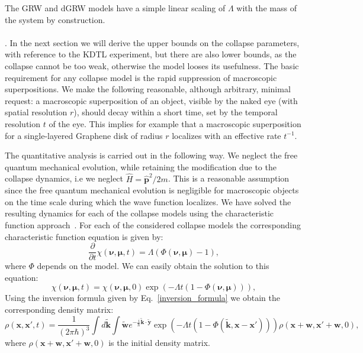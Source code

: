 \documentclass[12pt,groupedaddress,pra,aps]{revtex4-1}
\begin{document}
The GRW and dGRW models have a simple linear scaling of $\Lambda$ with the mass of the system by construction. \\ \\

.
In the next section we will derive the upper bounds on the collapse parameters, with reference to the KDTL experiment, but there are also lower bounds, as the collapse cannot be too weak, otherwise the model looses its usefulness. The basic requirement for any collapse model is the rapid suppression of  macroscopic superpositions. We make the following reasonable, although arbitrary, minimal request: a macroscopic superposition of an object, visible by the naked eye (with spatial resolution $r$), should decay within a short time, set by the temporal resolution $t$ of the eye. This implies for example that a macroscopic superposition for a single-layered Graphene disk of radius $r$ localizes with an effective rate $t^{-1}$. 

The quantitative analysis is carried out in the following way. We neglect the free quantum mechanical evolution, while retaining the modification due to the collapse dynamics, i.e we neglect $\hat{H} = \bm{\hat{p}}^2/2m$. This is a reasonable assumption since the free quantum mechanical evolution is negligible for macroscopic objects on the time scale during which the wave function localizes. We have solved the resulting dynamics for each of the collapse models using the characteristic function approach~\cite{PhysRevA.82.042111}. For each of the considered collapse models the corresponding characteristic function equation is given by: 
\begin{equation}\label{chi_eq_localization}
\frac{\partial}{\partial t}\chi(\bm{\nu},\bm{\mu},t)= \Lambda\left(\Phi(\bm{\nu},\bm{\mu}) -1\right),
\end{equation}
where $\Phi$ depends on the model. We can easily obtain the solution to this equation:
\begin{equation}\label{chi_eq_solution}
\chi(\bm{\nu},\bm{\mu},t)= \chi(\bm{\nu},\bm{\mu},0) 
\exp \left(-\Lambda t(1- \Phi(\bm{\nu},\bm{\mu}))\right),
\end{equation}
Using the inversion formula given by Eq.~\eqref{inversion_formula} we obtain the corresponding density matrix: 
\begin{equation}\label{Crho_grw_dp3_localization}
\rho(\bm{x},\bm{x'},t)=\frac{1}{(2\pi\hbar)^3} \int d\bm{\tilde{k}}  \int \bm{\tilde{w}} e^{-\frac{i}{\hbar}\bm{\tilde{k}} \cdot \bm{\tilde{y}}} \exp \left( -\Lambda t(1- \Phi(\bm{\tilde{k}},\bm{x}-\bm{x'})) \right)
 \rho(\bm{x}+\bm{w},\bm{x'}+\bm{w},0),
\end{equation}
where $\rho(\bm{x}+\bm{w},\bm{x'}+\bm{w},0)$ is the initial density matrix.
\end{document}
